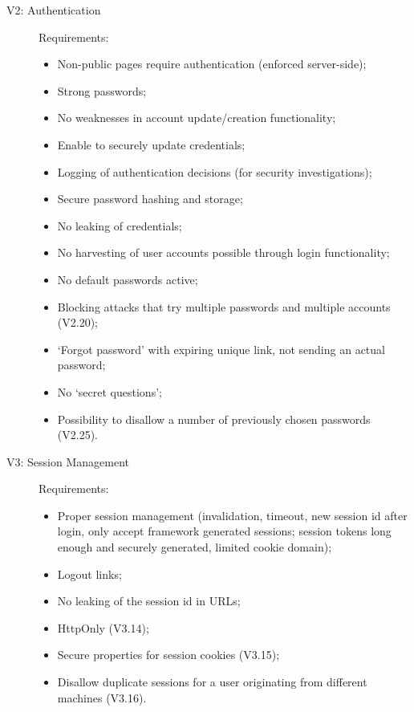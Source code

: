 \documentclass[a4paper]{report}
\begin{document}
\begin{description}
\item[V2: Authentication] Requirements:
\begin{itemize}
\item Non-public pages require authentication (enforced server-side); 
\item Strong passwords; 
\item No weaknesses in account update/creation functionality; 
\item Enable to securely update credentials; 
\item Logging of authentication decisions (for security investigations);
\item Secure password hashing and storage;
\item No leaking of credentials;
\item No harvesting of user accounts possible through login functionality;
\item No default passwords active;
\item Blocking attacks that try multiple passwords and multiple accounts (V2.20);
\item `Forgot password' with expiring unique link, not sending an actual password;
\item No `secret questions';
\item Possibility to disallow a number of previously chosen passwords (V2.25).
\end{itemize}

\item[V3: Session Management] Requirements:
\begin{itemize}
\item Proper session management (invalidation, timeout, new session id after login,
only accept framework generated sessions; session tokens long enough and securely generated,
limited cookie domain);
\item Logout links;
\item No leaking of the session id in URLs;
\item HttpOnly (V3.14);
\item Secure properties for session cookies (V3.15);
\item Disallow duplicate sessions for a user originating from different machines (V3.16).
\end{itemize}


\end{description}
\end{document}
